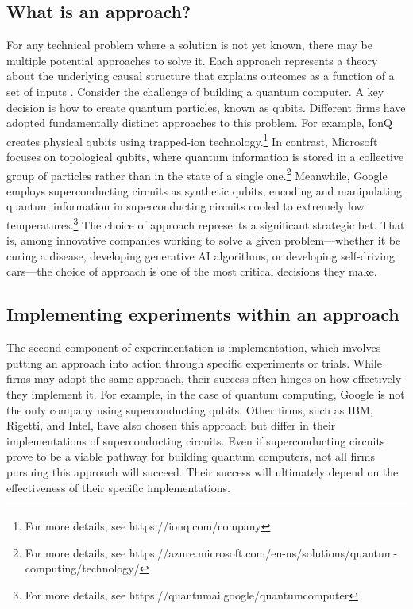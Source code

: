 \subsection{What is an approach?}

For any technical problem where a solution is not yet known, there may be multiple potential approaches to solve it. Each approach represents a theory about the underlying causal structure that explains outcomes as a function of a set of inputs \citep{sorenson2024theory}. Consider the challenge of building a quantum computer. A key decision is how to create quantum particles, known as qubits. Different firms have adopted fundamentally distinct approaches to this problem. For example, IonQ creates physical qubits using trapped-ion technology.\footnote{For more details, see https://ionq.com/company} In contrast, Microsoft focuses on topological qubits, where quantum information is stored in a collective group of particles rather than in the state of a single one.\footnote{For more details, see https://azure.microsoft.com/en-us/solutions/quantum-computing/technology/} Meanwhile, Google employs superconducting circuits as synthetic qubits, encoding and manipulating quantum information in superconducting circuits cooled to extremely low temperatures.\footnote{For more details, see https://quantumai.google/quantumcomputer} The choice of approach represents a significant strategic bet. That is, among innovative companies working to solve a given problem---whether it be curing a disease, developing generative AI algorithms, or developing self-driving cars---the choice of approach is one of the most critical decisions they make.

\subsection{Implementing experiments within an approach}

The second component of experimentation is implementation, which involves putting an approach into action through specific experiments or trials. While firms may adopt the same approach, their success often hinges on how effectively they implement it. For example, in the case of quantum computing, Google is not the only company using superconducting qubits. Other firms, such as IBM, Rigetti, and Intel, have also chosen this approach but differ in their implementations of superconducting circuits. Even if superconducting circuits prove to be a viable pathway for building quantum computers, not all firms pursuing this approach will succeed. Their success will ultimately depend on the effectiveness of their specific implementations.

